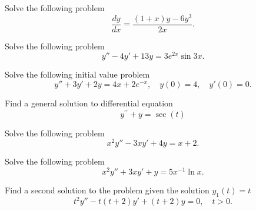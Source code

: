 \documentclass[11pt]{article}
\begin{document}
\begin{problem}
Solve the following problem
\begin{equation*}
     \frac{dy}{dx}=\frac{(1+x)y-6y^{3}}{2x}.
\end{equation*}
\end{problem}


\begin{problem}
Solve the following problem
\begin{equation*}
     y''-4y'+13y=3e^{2x}\sin 3x.
\end{equation*}
\end{problem}



\begin{problem}
Solve the following initial value problem
\begin{equation*}
     y''+3y'+2y=4x+2e^{-x}, \quad y(0)=4, \quad y'(0)=0.
\end{equation*}
\end{problem}


\begin{problem}
Find a general solution to differential equation
\begin{equation*}
y^{\prime \prime} + y = \sec(t)
\end{equation*}
\end{problem}



\begin{problem}
Solve the following problem
\begin{equation*}
     x^{2}y''-3xy'+4y=x+2.
\end{equation*}
\end{problem}


\begin{problem}
Solve the following problem
\begin{equation*}     
     x^{2}y''+3xy'+y=5x^{-1}\ln x.
\end{equation*}
\end{problem}



% 
% 
% 
% 
% 
\begin{problem}
Find a second solution to the problem given the solution $y_{1}(t)=t$
\begin{equation*}
t^{2}y''-t(t+2)y'+(t+2)y=0, \quad t>0.
\end{equation*}
\end{problem}
\end{document}
